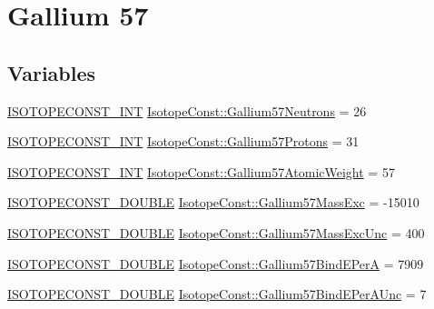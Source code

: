 \hypertarget{group___isotope_const-_gallium-_ga57}{}\section{Gallium 57}
\label{group___isotope_const-_gallium-_ga57}
\subsection*{Variables}
\begin{DoxyCompactItemize}
\item 
\mbox{\hyperlink{group___isotope_const-_macros_ga5f18360b3e99483a35c32d789e62621c}{I\+S\+O\+T\+O\+P\+E\+C\+O\+N\+S\+T\+\_\+\+I\+NT}} \mbox{\hyperlink{group___isotope_const-_gallium-_ga57_ga2b8c2b142eaf0bedcc26919e1057019e}{Isotope\+Const\+::\+Gallium57\+Neutrons}} = 26
\item 
\mbox{\hyperlink{group___isotope_const-_macros_ga5f18360b3e99483a35c32d789e62621c}{I\+S\+O\+T\+O\+P\+E\+C\+O\+N\+S\+T\+\_\+\+I\+NT}} \mbox{\hyperlink{group___isotope_const-_gallium-_ga57_gad9db1252763a30c2663984bc6e6ac5f7}{Isotope\+Const\+::\+Gallium57\+Protons}} = 31
\item 
\mbox{\hyperlink{group___isotope_const-_macros_ga5f18360b3e99483a35c32d789e62621c}{I\+S\+O\+T\+O\+P\+E\+C\+O\+N\+S\+T\+\_\+\+I\+NT}} \mbox{\hyperlink{group___isotope_const-_gallium-_ga57_ga40662e813bf0354264ffc79477d297a7}{Isotope\+Const\+::\+Gallium57\+Atomic\+Weight}} = 57
\item 
\mbox{\hyperlink{group___isotope_const-_macros_ga8f45a7272ce02c0b4c65c44636ed719a}{I\+S\+O\+T\+O\+P\+E\+C\+O\+N\+S\+T\+\_\+\+D\+O\+U\+B\+LE}} \mbox{\hyperlink{group___isotope_const-_gallium-_ga57_ga089d25f43ce305fc5fc86a5510a403d0}{Isotope\+Const\+::\+Gallium57\+Mass\+Exc}} = -\/15010
\item 
\mbox{\hyperlink{group___isotope_const-_macros_ga8f45a7272ce02c0b4c65c44636ed719a}{I\+S\+O\+T\+O\+P\+E\+C\+O\+N\+S\+T\+\_\+\+D\+O\+U\+B\+LE}} \mbox{\hyperlink{group___isotope_const-_gallium-_ga57_ga838964749f9aa96843d8612e370e9e51}{Isotope\+Const\+::\+Gallium57\+Mass\+Exc\+Unc}} = 400
\item 
\mbox{\hyperlink{group___isotope_const-_macros_ga8f45a7272ce02c0b4c65c44636ed719a}{I\+S\+O\+T\+O\+P\+E\+C\+O\+N\+S\+T\+\_\+\+D\+O\+U\+B\+LE}} \mbox{\hyperlink{group___isotope_const-_gallium-_ga57_ga945c981034cba5870da3e0e97669a06c}{Isotope\+Const\+::\+Gallium57\+Bind\+E\+PerA}} = 7909
\item 
\mbox{\hyperlink{group___isotope_const-_macros_ga8f45a7272ce02c0b4c65c44636ed719a}{I\+S\+O\+T\+O\+P\+E\+C\+O\+N\+S\+T\+\_\+\+D\+O\+U\+B\+LE}} \mbox{\hyperlink{group___isotope_const-_gallium-_ga57_ga5007628c013b48070fe3c6569109b7b7}{Isotope\+Const\+::\+Gallium57\+Bind\+E\+Per\+A\+Unc}} = 7

\end{DoxyCompactItemize}
